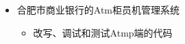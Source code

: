 \documentclass{resume}
\begin{document}
\begin{itemize}
  \item 合肥市商业银行的Atm柜员机管理系统
  \begin{itemize}
    \item 改写、调试和测试Atmp端的代码
  \end{itemize}
\end{itemize}

%
%
\end{document}
